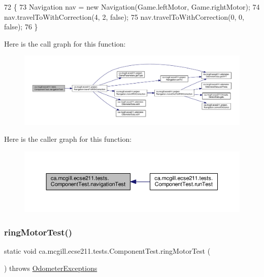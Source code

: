 \begin{DoxyCode}
72                                                                 \{
73     Navigation nav = \textcolor{keyword}{new} Navigation(Game.leftMotor, Game.rightMotor);
74     nav.travelToWithCorrection(4, 2, \textcolor{keyword}{false});
75     nav.travelToWithCorrection(0, 0, \textcolor{keyword}{false});
76   \}
\end{DoxyCode}
Here is the call graph for this function\+:
\nopagebreak
\begin{figure}[H]
\begin{center}
\leavevmode
\includegraphics[width=350pt]{enumca_1_1mcgill_1_1ecse211_1_1tests_1_1_component_test_aa40592bb550b3526402faddbc0d890c7_cgraph}
\end{center}
\end{figure}
Here is the caller graph for this function\+:
\nopagebreak
\begin{figure}[H]
\begin{center}
\leavevmode
\includegraphics[width=350pt]{enumca_1_1mcgill_1_1ecse211_1_1tests_1_1_component_test_aa40592bb550b3526402faddbc0d890c7_icgraph}
\end{center}
\end{figure}
\mbox{\label{enumca_1_1mcgill_1_1ecse211_1_1tests_1_1_component_test_a1ecca45b47067d825683cf46dcf22b62}} 
\subsubsection{\texorpdfstring{ring\+Motor\+Test()}{ringMotorTest()}}
{\footnotesize\ttfamily static void ca.\+mcgill.\+ecse211.\+tests.\+Component\+Test.\+ring\+Motor\+Test (\begin{DoxyParamCaption}{ }\end{DoxyParamCaption}) throws \hyperlink{classca_1_1mcgill_1_1ecse211_1_1odometer_1_1_odometer_exceptions}{Odometer\+Exceptions}\hspace{0.3cm}{\ttfamily [static]}}

